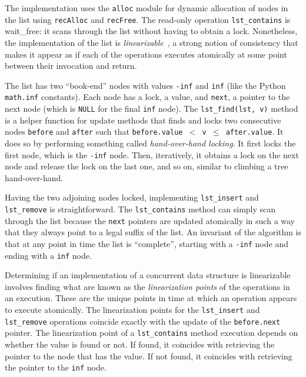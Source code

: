 \documentclass{report}
\begin{document}

The implementation uses the \texttt{alloc} module for dynamic allocation
of nodes in the list using \texttt{recAlloc} and \texttt{recFree}.
The read-only operation \texttt{lst\_contains} is wait\_free: it scans
through the list without having to obtain a lock.
Nonetheless, the implementation of the list is
\emph{linearizable}~\cite{HW90},
a strong notion of consistency that
makes it appear as if each of the operations executes atomically at
some point between their invocation and return.

The list has two ``book-end'' nodes with values \texttt{-inf} and
\texttt{inf} (like the Python \texttt{math.inf} constants).
Each node has a lock, a value, and \texttt{next}, a pointer to the next node
(which is \texttt{NULL} for the final \texttt{inf} node).
The \texttt{lst\_find(lst, v)} method is a helper function for update
methods that
finds and locks two consecutive nodes \texttt{before} and \texttt{after}
such that \texttt{before.value $<$ v $\le$ after.value}.
It does so by performing something called \emph{hand-over-hand locking}.
It first locks the first node, which is the \texttt{-inf} node.
Then, iteratively, it obtains a lock on the next node and release the
lock on the last one, and so on, similar to climbing a tree
hand-over-hand.

Having the two adjoining nodes locked, implementing \texttt{lst\_insert}
and \texttt{lst\_remove} is straightforward.
The \texttt{lst\_contains} method can simply scan through the list
because the \texttt{next} pointers are updated atomically in such a
way that they always point to a legal suffix of the list.
An invariant of the algorithm is that at any point in time the
list is ``complete'', starting with a \texttt{-inf} node and ending
with a \texttt{inf} node.

Determining if an implementation of a concurrent data structure
is linearizable involves finding what are known as the
\emph{linearization points}
of the operations in an execution.  These are the unique
points in time at which an operation appears to execute atomically.
The linearization points for the \texttt{lst\_insert} and
\texttt{lst\_remove} operations coincide exactly with the update
of the \texttt{before.next} pointer.
The linearization point of a \texttt{lst\_contains} method
execution depends on whether the value is found or not.
If found, it coincides with retrieving the pointer to the node
that has the value.
If not found, it coincides with retrieving the pointer to the
\texttt{inf} node.
\end{document}
